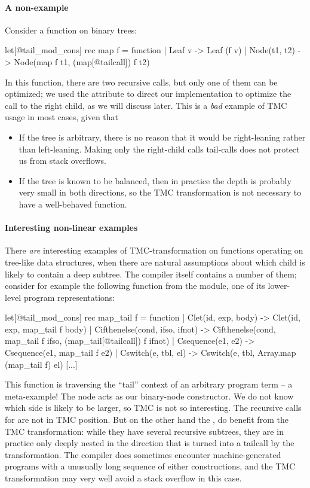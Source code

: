 \paragraph{A non-example} Consider a  function on binary
trees:
\begin{Ocaml}
let[@tail_mod_cons] rec map f = function
| Leaf v -> Leaf (f v)
| Node(t1, t2) -> Node(map f t1, (map[@tailcall]) f t2)
\end{Ocaml}
In this function, there are two recursive calls, but only one of them
can be optimized; we used the \ocaml{[@tailcall]} attribute to direct
our implementation to optimize the call to the right child, as we will
discuss later. This is a \emph{bad} example of TMC usage in most
cases, given that
\begin{itemize}
\item If the tree is arbitrary, there is no reason that it would be
  right-leaning rather than left-leaning. Making only the right-child
  calls tail-calls does not protect us from stack overflows.
\item If the tree is known to be balanced, then in practice the depth
  is probably very small in both directions, so the TMC transformation
  is not necessary to have a well-behaved function.
\end{itemize}

\paragraph{Interesting non-linear examples} There \emph{are} interesting
examples of TMC-transformation on functions operating on tree-like
data structures, when there are natural assumptions about which child
is likely to contain a deep subtree. The \OCaml compiler itself
contains a number of them; consider for example the following function
from the  module, one of its lower-level program
representations:

\begin{Ocaml}
let[@tail_mod_cons] rec map_tail f = function
  | Clet(id, exp, body) ->
      Clet(id, exp, map_tail f body)
  | Cifthenelse(cond, ifso, ifnot) ->
      Cifthenelse(cond, map_tail f ifso, (map_tail[@tailcall]) f ifnot)
  | Csequence(e1, e2) ->
      Csequence(e1, map_tail f e2)
  | Cswitch(e, tbl, el) ->
      Cswitch(e, tbl, Array.map (map_tail f) el)
  [...]
\end{Ocaml}

This function is traversing the ``tail'' context of an arbitrary program term -- a meta-example!
The  node acts as our binary-node constructor.
We do not know which side is likely to be larger, so TMC is not so interesting.
The recursive calls for  are not in TMC position.
But on the other hand the ,  do benefit from the TMC transformation: while they have several recursive subtrees, they are in practice only deeply nested in the direction that is turned into a tailcall by the transformation.
The \OCaml compiler does sometimes encounter machine-generated programs with a unusually long sequence of either constructions, and the TMC transformation may very well avoid a stack overflow in this case.

